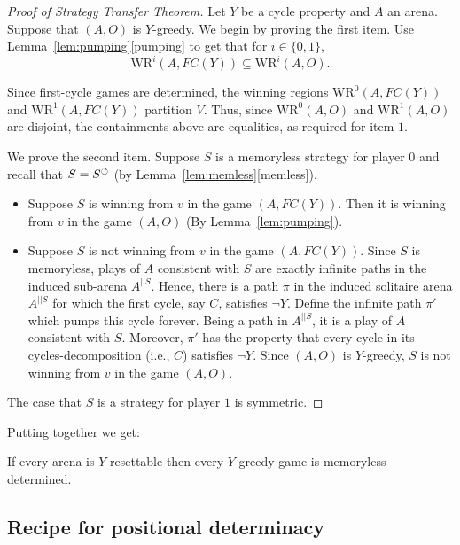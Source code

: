 \documentclass[a4paper,10pt]{article}
\newcommand{\WR}{\textrm{WR}}
\begin{document}
\begin{proof}[Proof of Strategy Transfer Theorem]
Let $Y$ be a cycle property and $A$ an arena.  Suppose that $(A,O)$ is $Y$-greedy.
We begin by proving the first item. Use Lemma~\ref{lem:pumping}[pumping] to get that for $i \in \{0,1\}$,
\[
\WR^i(A,FC(Y)) \subseteq \WR^i(A,O).
\]

Since first-cycle games are determined, the winning regions $\WR^0(A,FC(Y))$ and $\WR^1(A,FC(Y))$ partition $V$. Thus, since $\WR^0(A,O)$ and $\WR^1(A,O)$ are disjoint, the containments above are equalities, as
required for item $1$.

We prove the second item. Suppose $S$ is a memoryless strategy for player $0$ and recall that $S = S^{\circlearrowleft}$ (by Lemma~\ref{lem:memless}[memless]).

\begin{itemize}
 \item Suppose $S$ is winning from $v$ in the game $(A,FC(Y))$. Then it is winning from $v$ in the game $(A,O)$ (By Lemma~\ref{lem:pumping}).

\item Suppose $S$ is not winning from $v$ in the game $(A,FC(Y))$. Since $S$ is memoryless, plays of $A$ consistent with $S$ are exactly infinite paths in the induced sub-arena $A^{||S}$.
Hence, there is a path $\pi$ in the induced solitaire arena $A^{||S}$ for which the first cycle, say $C$, satisfies $\neg Y$. Define the infinite path $\pi'$ which pumps this cycle forever. 
Being a path in $A^{||S}$, it is a play of $A$ consistent with $S$. Moreover, $\pi'$ has the property that every cycle in its cycles-decomposition (i.e., $C$) satisfies $\neg Y$. 
Since $(A,O)$ is $Y$-greedy, $S$ is not winning from $v$ in the game $(A,O)$.
\end{itemize}
The case that $S$ is a strategy for player $1$ is symmetric.
\end{proof}

Putting together we get: 
\begin{theorem} 
If every arena is $Y$-resettable then every $Y$-greedy game is memoryless determined.
\end{theorem}

\subsection*{Recipe for positional determinacy}
\end{document}
